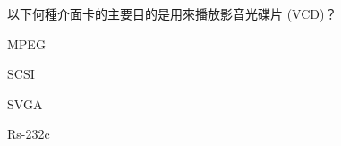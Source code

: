 \ifx\ntpcNinetyTwo\undefined[92學年基北區] \fi
以下何種介面卡的主要目的是用來播放影音光碟片 (VCD)？
  \begin{optionlist}
  \item MPEG\label{ntpc-92-a48}
  \item SCSI
  \item SVGA
  \item Rs-232c
  \end{optionlist}